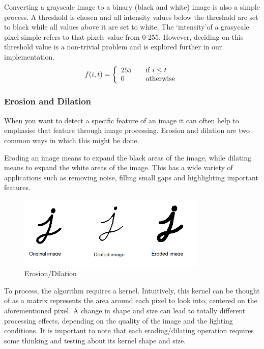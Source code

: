 Converting a grayscale image to a binary (black and white) image is also a simple process. A threshold is chosen and all intensity values below the threshold are set to black while all values above it are set to white. The \lq intensity\rq of a grasycale pixel simple refers to that pixels value from 0-255. However, deciding on this threshold value is a non-trivial problem and is explored further in our implementation.   
\[ f(i,t) = \left\{ 
  \begin{array}{l l}
    255 & \quad \text{if } i \leq  t\\
    0   & \quad \text{otherwise}
  \end{array} \right.\]

        \subsubsection{Erosion and Dilation}

When you want to detect a specific feature of an image it can often help to emphasise that feature through image processing. Erosion and dilation are two common ways in which this might be done.

Eroding an image means to expand the black areas of the image, while dilating means to expand the white areas of the image. This has a wide variety of applications such as removing noise, filling small gaps and highlighting important features.
            \begin{figure}[ht!]
                \centering
                \includegraphics[width=90mm]{./assets/dilated.png}
                \caption{Erosion/Dilation}
                \label{image:dilationerosion}
            \end{figure}
To process, the algorithm requires a kernel. Intuitively, this kernel can be thought of as a matrix represents the area around each pixel to look into, centered on the aforementioned pixel. A change in shape and size can lead to totally different processing effects, depending on the quality of the image and the lighting conditions.
It is important to note that each eroding/dilating operation requires some thinking and testing about its kernel shape and size.

